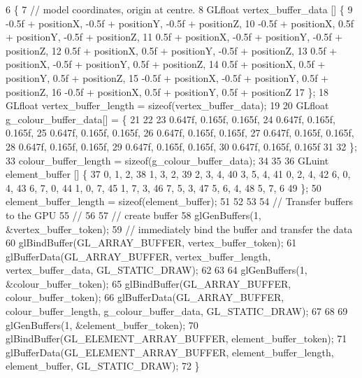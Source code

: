 \begin{DoxyCode}
6                                                                                \{
7   \textcolor{comment}{// model coordinates, origin at centre.}
8   GLfloat vertex\_buffer\_data [] \{
9         -0.5f + positionX, -0.5f + positionY, -0.5f + positionZ,
10         -0.5f + positionX,  0.5f + positionY, -0.5f + positionZ,
11          0.5f + positionX, -0.5f + positionY, -0.5f + positionZ,
12          0.5f + positionX,  0.5f + positionY, -0.5f + positionZ,
13          0.5f + positionX, -0.5f + positionY,  0.5f + positionZ,
14          0.5f + positionX,  0.5f + positionY,  0.5f + positionZ,
15         -0.5f + positionX, -0.5f + positionY,  0.5f + positionZ,
16         -0.5f + positionX,  0.5f + positionY,  0.5f + positionZ
17   \};
18   GLfloat vertex\_buffer\_length = \textcolor{keyword}{sizeof}(vertex\_buffer\_data);
19 
20    GLfloat g\_colour\_buffer\_data[] = \{
21 
22 
23         0.647f, 0.165f, 0.165f,
24         0.647f, 0.165f, 0.165f,
25         0.647f, 0.165f, 0.165f,
26         0.647f, 0.165f, 0.165f,
27         0.647f, 0.165f, 0.165f,
28         0.647f, 0.165f, 0.165f,
29         0.647f, 0.165f, 0.165f,
30         0.647f, 0.165f, 0.165f
31 
32   \};
33     colour\_buffer\_length = \textcolor{keyword}{sizeof}(g\_colour\_buffer\_data);
34 
35 
36   GLuint element\_buffer []  \{
37         0, 1, 2,
38         1, 3, 2,
39         2, 3, 4,
40         3, 5, 4,
41         0, 2, 4,
42         6, 0, 4,
43         6, 7, 0,
44         1, 0, 7,
45         1, 7, 3,
46         7, 5, 3,
47         5, 6, 4,
48         5, 7, 6
49   \};
50   element\_buffer\_length = \textcolor{keyword}{sizeof}(element\_buffer);
51 
52 
53 
54   \textcolor{comment}{// Transfer buffers to the GPU}
55   \textcolor{comment}{//}
56 
57   \textcolor{comment}{// create buffer}
58   glGenBuffers(1, &vertex\_buffer\_token);
59   \textcolor{comment}{// immediately bind the buffer and transfer the data}
60   glBindBuffer(GL\_ARRAY\_BUFFER, vertex\_buffer\_token);
61   glBufferData(GL\_ARRAY\_BUFFER, vertex\_buffer\_length, vertex\_buffer\_data, GL\_STATIC\_DRAW);
62 
63 
64     glGenBuffers(1, &colour\_buffer\_token);
65     glBindBuffer(GL\_ARRAY\_BUFFER, colour\_buffer\_token);
66     glBufferData(GL\_ARRAY\_BUFFER, colour\_buffer\_length, g\_colour\_buffer\_data, GL\_STATIC\_DRAW);
67 
68 
69   glGenBuffers(1, &element\_buffer\_token);
70   glBindBuffer(GL\_ELEMENT\_ARRAY\_BUFFER, element\_buffer\_token);
71   glBufferData(GL\_ELEMENT\_ARRAY\_BUFFER, element\_buffer\_length, element\_buffer, GL\_STATIC\_DRAW);
72 \}
\end{DoxyCode}
\hypertarget{classGroundAsset_a8f607f3cabded6280c5a5eb2cbfa8c79}{}
